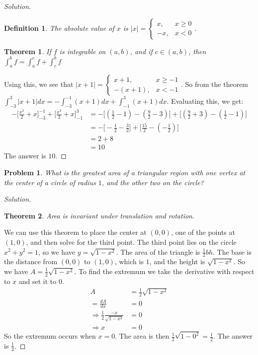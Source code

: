 \documentclass[crop=false,class=book]{standalone}
\theoremstyle{mystyle}
\newtheorem{problem}{Problem}[section]
\newtheorem*{theorem*}{Theorem}
\newtheorem*{definition*}{Definition}
\begin{document}
\begin{proof}[Solution]
\begin{definition*}
The absolute value of $x$ is $|x| = \begin{cases}x, & x\geq 0 \\ -x, & x<0\end{cases}$.
\end{definition*}
\begin{theorem*}
If $f$ is integrable on $(a,b)$, and if $c\in (a,b)$, then $\int_{a}^{b} f = \int_{a}^{c}f + \int_{c}^{b} f$
\end{theorem*}
Using this, we see that $|x+1| = \begin{cases} x+1, & x\geq -1 \\ -(x+1), & x < -1\end{cases}$. So from the theorem $\int_{-3}^{3}|x+1|dx = -\int_{-3}^{-1}(x+1)dx + \int_{-1}^{3}(x+1)dx$. Evaluating this, we get:
\begin{align*}
    -\bigg[\frac{x^2}{2}+x\bigg]_{-3}^{-1}+\bigg[\frac{x^2}{2}+x\bigg]_{-1}^{3}&=-\bigg[(\frac{1}{2}-1)-(\frac{9}{2}-3)\bigg]+\bigg[(\frac{9}{2}+3)-(\frac{1}{2}-1)\bigg]\\
    &=-\bigg[-\frac{1}{2}-\frac{3}{2}\bigg]+\bigg[\frac{15}{2}-(-\frac{1}{2})\bigg]\\
    &=2+8\\ 
    &=10
\end{align*}
The answer is $10$.
\end{proof}
\begin{problem}
What is the greatest area of a triangular region with one vertex at the center of a circle of radius $1$, and the other two on the circle?
\end{problem}
\begin{proof}[Solution]
\begin{theorem*}
Area is invariant under translation and rotation.
\end{theorem*}
We can use this theorem to place the center at $(0,0)$, one of the points at $(1,0)$, and then solve for the third point. The third point lies on the circle $x^2+y^2 = 1$, so we have $y = \sqrt{1-x^2}$. The area of the triangle is $\frac{1}{2}bh$. The base is the distance from $(0,0)$ to $(1,0)$, which is $1$, and the height is $\sqrt{1-x^2}$. So we have $A = \frac{1}{2}\sqrt{1-x^2}$. To find the extremum we take the derivative with respect to $x$ and set it to $0$.
\begin{align*}
    A&=\frac{1}{2}\sqrt{1-x^{2}}\\
    =\frac{dA}{dx}&=0\\
    \Rightarrow\frac{1}{2}\frac{-x}{\sqrt{1-x^{2}}}&=0\\
    \Rightarrow x&=0
\end{align*}
So the extremum occurs when $x=0$. The area is then $\frac{1}{2}\sqrt{1-0^2} = \frac{1}{2}$. The answer is $\frac{1}{2}$.
\end{proof}
\end{document}
